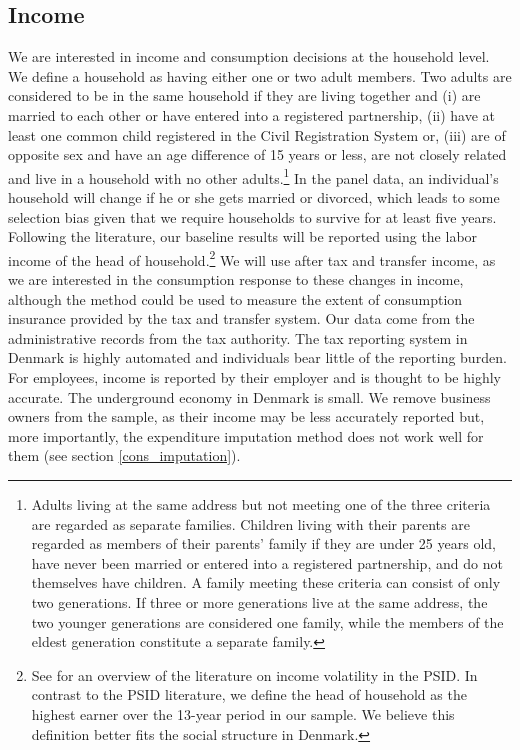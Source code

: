 \documentclass[titlepage]{\econtex}\newcommand{\texname}{ConsumptionHeterogeneity}
\begin{document}
\subsection{Income} \label{income}
We are interested in income and consumption decisions at the household level. We define a household as having either one or two adult members. Two adults are considered to be in the same household if they are living together and (i) are married to each other or have entered into a registered partnership, (ii) have at least one common child registered in the Civil Registration System or, (iii) are of opposite sex and have an age difference of 15 years or less, are not closely related and live in a household with no other adults.\footnote{Adults living at the same address but not meeting one of the three criteria are regarded as separate families. Children living with their parents are regarded as members of their parents' family if they are under 25 years old, have never been married or entered into a registered partnership, and do not themselves have children. A family meeting these criteria can consist of only two generations. If three or more generations live at the same address, the two younger generations are considered one family, while the members of the eldest generation constitute a separate family.} In the panel data, an individual's household will change if he or she gets married or divorced, which leads to some selection bias given that we require households to survive for at least five years. Following the literature, our baseline results will be reported using the labor income of the head of household.\footnote{See \cite{moffitt_income_2018} for an overview of the literature on income volatility in the PSID. In contrast to the PSID literature, we define the head of household as the highest earner over the 13-year period in our sample. We believe this definition better fits the social structure in Denmark.} We will use after tax and transfer income, as we are interested in the consumption response to these changes in income, although the method could be used to measure the extent of consumption insurance provided by the tax and transfer system. Our data come from the administrative records from the tax authority. The tax reporting system in Denmark is highly automated and individuals bear little of the reporting burden. For employees, income is reported by their employer and is thought to be highly accurate. The underground economy in Denmark is small. We remove business owners from the sample, as their income may be less accurately reported but, more importantly, the expenditure imputation method does not work well for them (see section \ref{cons_imputation}).
\end{document}
